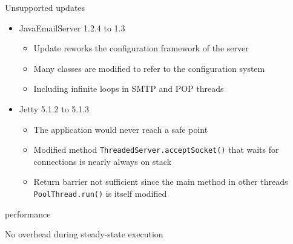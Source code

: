 \begin{frame}{Unsupported updates}%
\begin{itemize}
\item JavaEmailServer 1.2.4 to 1.3
  \begin{itemize}
  \item Update reworks the configuration framework of the server
  \item Many classes are modified to refer to the configuration system
  \item Including infinite loops in SMTP and POP threads
  \end{itemize}
\item Jetty 5.1.2 to 5.1.3
  \begin{itemize}
  \item The application would never reach a safe point
  \item Modified method {\tt ThreadedServer.acceptSocket()} that waits for
        connections is nearly always on stack
  \item Return barrier not sufficient since the main method in other
        threads {\tt PoolThread.run()} is itself modified
  \end{itemize}
\end{itemize}
\end{frame}

\begin{frame}{\DSU{} performance}%
\begin{center}
{\Large No overhead during steady-state execution}
\end{center}
\vspace{1ex}
\begin{center}
%
\end{center}
\end{frame}

